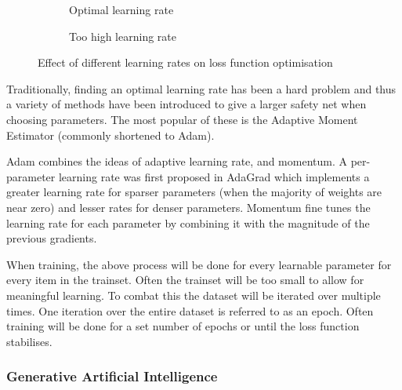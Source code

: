 \begin{figure}[h]
\begin{subfigure}{0.3\textwidth}
\begin{tikzpicture}
        \end{tikzpicture}
        \caption{Optimal learning rate}
    \end{subfigure}
    \hfill
    \begin{subfigure}{0.3\textwidth}
        \centering
        \caption{Too high learning rate}
    \end{subfigure}
    \caption{Effect of different learning rates on loss function optimisation}
    \label{fig:learning-rates}
\end{figure}

Traditionally, finding an optimal learning rate has been a hard problem and thus a variety of methods have been introduced to give a larger safety net when choosing parameters. The most popular of these is the Adaptive Moment Estimator (commonly shortened to Adam)\cite{kingma2014adam}.

Adam combines the ideas of adaptive learning rate, and momentum. A per-parameter learning rate was first proposed in AdaGrad\cite{duchi2011adaptive} which implements a greater learning rate for sparser parameters (when the majority of weights are near zero) and lesser rates for denser parameters. Momentum fine tunes the learning rate for each parameter by combining it with the magnitude of the previous gradients.

When training, the above process will be done for every learnable parameter for every item in the trainset. Often the trainset will be too small to allow for meaningful learning. To combat this the dataset will be iterated over multiple times. One iteration over the entire dataset is referred to as an epoch\cite{begmann-backpropagation}. Often training will be done for a set number of epochs or until the loss function stabilises. 

\subsubsection{Generative Artificial Intelligence}

